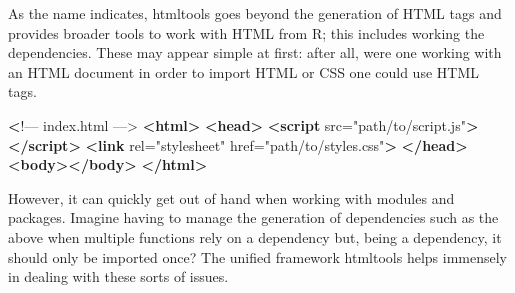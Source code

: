 \documentclass[
  10pt,
]{krantz}
\makeatletter
\newenvironment{Shaded}{\begin{snugshade}}{\end{snugshade}}
\newcommand{\ControlFlowTok}[1]{\textcolor[rgb]{0.27,0.27,0.27}{\textbf{#1}}}
\newcommand{\DataTypeTok}[1]{\textcolor[rgb]{0.27,0.27,0.27}{#1}}
\newcommand{\ErrorTok}[1]{\textcolor[rgb]{0.14,0.14,0.14}{\textbf{#1}}}
\newcommand{\KeywordTok}[1]{\textcolor[rgb]{0.27,0.27,0.27}{\textbf{#1}}}
\newcommand{\NormalTok}[1]{#1}
\newcommand{\OperatorTok}[1]{\textcolor[rgb]{0.43,0.43,0.43}{\textbf{#1}}}
\newcommand{\OtherTok}[1]{\textcolor[rgb]{0.37,0.37,0.37}{#1}}
\newcommand{\StringTok}[1]{\textcolor[rgb]{0.5,0.5,0.5}{#1}}
\newenvironment{kframe}{%
\medskip{}
\setlength{\fboxsep}{.8em}
 \def\at@end@of@kframe{}%
 \ifinner\ifhmode%
  \def\at@end@of@kframe{\end{minipage}}%
  \begin{minipage}{\columnwidth}%
 \fi\fi%
 \def\FrameCommand##1{\hskip\@totalleftmargin \hskip-\fboxsep
 \colorbox{shadecolor}{##1}\hskip-\fboxsep
     \hskip-\linewidth \hskip-\@totalleftmargin \hskip\columnwidth}%
 \MakeFramed {\advance\hsize-\width
   \@totalleftmargin\z@ \linewidth\hsize
   \@setminipage}}%
 {\par\unskip\endMakeFramed%
 \at@end@of@kframe}
\renewenvironment{Shaded}{\begin{kframe}}{\end{kframe}}
\makeatother
\begin{document}
\begin{Shaded}
\end{Shaded}

As the name indicates, htmltools goes beyond the generation of HTML tags and provides broader tools to work with HTML from R; this includes working the dependencies. These may appear simple at first: after all, were one working with an HTML document in order to import HTML or CSS one could use HTML tags.

\begin{Shaded}
\begin{Highlighting}[]
 \ErrorTok{<}\NormalTok{!–– index.html ––>}
\KeywordTok{<html>}
  \KeywordTok{<head>}
    \KeywordTok{<script}\OtherTok{ src=}\StringTok{"path/to/script.js"}\KeywordTok{></script>}
    \KeywordTok{<link}\OtherTok{ rel=}\StringTok{"stylesheet"}\OtherTok{ href=}\StringTok{"path/to/styles.css"}\KeywordTok{>}
  \KeywordTok{</head>}
  \KeywordTok{<body></body>}
\KeywordTok{</html>}
\end{Highlighting}
\end{Shaded}

However, it can quickly get out of hand when working with modules and packages. Imagine having to manage the generation of dependencies such as the above when multiple functions rely on a dependency but, being a dependency, it should only be imported once? The unified framework htmltools helps immensely in dealing with these sorts of issues.
\end{document}
